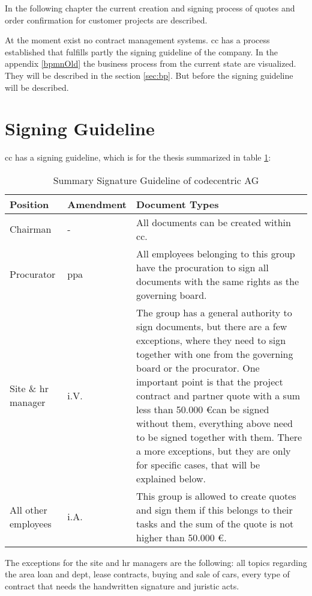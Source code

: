 In the following chapter the current creation and signing process of quotes and order confirmation for customer projects are described.

At the moment exist no contract management systems. \Gls{cc} has a process established that fulfills partly the signing guideline of the company. In the appendix \ref{bpmnOld} the business process from the current state are visualized. They will be described in the section \ref{sec:bp}. But before the signing guideline will be described.

\section{Signing Guideline} \label{sec:signingGuideline}

\Gls{cc} has a signing guideline, which is for the thesis summarized in table \ref{tab:summarySignatureGuideline}:
\begin{table}[h!]
	\begin{tabular}{|p{3cm}|p{2cm}|p{10cm}|}\hline
		\rowcolor{Gray}Position & Amendment & Document Types \\ \hline
		Chairman & - & All documents can be created within \gls{cc}. \\ \hline
		Procurator & ppa & All employees belonging to this group have the procuration to sign all documents with the same rights as the governing board.\\ \hline
		Site \& \gls{hr} manager & i.V. & The group has a general authority to sign documents, but there are a few exceptions, where they need to sign together with one from the governing board or the procurator. One important point is that the project contract and partner quote with a sum less than 50.000 \euro can be signed without them, everything above need to be signed together with them. There a more exceptions, but they are only for specific cases, that will be explained below. \\ \hline
		All other employees & i.A. & This group is allowed to create quotes and sign them if this belongs to their tasks and the sum of the quote is not higher than 50.000 \euro. \\ \hline
	\end{tabular}
	\caption{Summary Signature Guideline of codecentric AG}
	\label{tab:summarySignatureGuideline}
\end{table}

The exceptions for the site and \gls{hr} managers are the following: all topics regarding the area loan and dept, lease contracts, buying and sale of cars, every type of contract that needs the handwritten signature and juristic acts.

